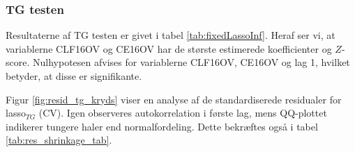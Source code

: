 \subsubsection{TG testen}
Resultaterne af TG testen er givet i tabel \ref{tab:fixedLassoInf}.
Heraf ser vi, at variablerne \textcolor{blue3}{CLF16OV} og \textcolor{blue3}{CE16OV} har de største estimerede koefficienter og $Z$-score.
Nulhypotesen afvises for variablerne \textcolor{blue3}{CLF16OV}, \textcolor{blue3}{CE16OV} og \textcolor{blue3}{lag 1}, hvilket betyder, at disse er signifikante.

Figur \ref{fig:resid_tg_kryds} viser en analyse af de standardiserede residualer for lasso$_{TG}$ (CV). 
Igen observeres autokorrelation i første lag, mens QQ-plottet indikerer tungere haler end normalfordeling. 
Dette bekræftes også i tabel \ref{tab:res_shrinkage_tab}.


%
